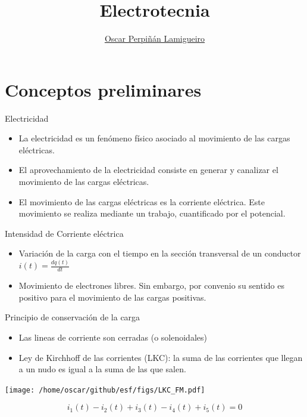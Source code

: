 \documentclass[xcolor={usenames,svgnames,dvipsnames}]{beamer}
\author{\href{https://oscarperpinan.github.io}{Oscar Perpiñán Lamigueiro}}
\date{}
\title{Electrotecnia}
\institute[UPM]{Universidad Politécnica de Madrid}
\begin{document}
\maketitle

\section{Conceptos preliminares}
\label{sec:org24e4283}

\begin{frame}[label={sec:org729fb29}]{Electricidad}
\begin{itemize}
\item La electricidad es un fenómeno físico asociado al \alert{movimiento de las
cargas eléctricas}.

\item El aprovechamiento de la electricidad consiste en generar y canalizar
el movimiento de las cargas eléctricas.

\item El movimiento de las cargas eléctricas es la \alert{corriente eléctrica}.
Este movimiento se realiza mediante un trabajo, cuantificado por el
\alert{potencial}.
\end{itemize}
\end{frame}

\begin{frame}[label={sec:orgf981f12}]{Intensidad de Corriente eléctrica}
\begin{itemize}
\item \alert{Variación de la carga con el tiempo en la sección transversal de un
conductor} \(i(t)=\frac{dq(t)}{dt}\)

\item Movimiento de electrones libres. Sin embargo, por convenio su sentido
es positivo para el movimiento de las cargas positivas.
\end{itemize}
\end{frame}

\begin{frame}[label={sec:org7f6aa5d}]{Principio de conservación de la carga}
\begin{itemize}
\item Las lineas de corriente son cerradas (o solenoidales)

\item \alert{Ley de Kirchhoff de las corrientes (LKC)}: la suma de las corrientes
que llegan a un nudo es igual a la suma de las que salen.
\end{itemize}

\begin{center}
\texttt{[image: /home/oscar/github/esf/figs/LKC\_FM.pdf]}
\end{center}

\[
i_1(t) - i_2(t) + i_3(t) - i_4(t) + i_5(t) = 0
\]
\end{frame}
\end{document}
